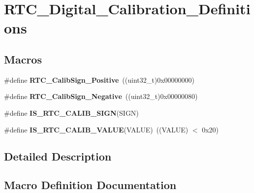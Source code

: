\hypertarget{group___r_t_c___digital___calibration___definitions}{}\section{R\+T\+C\+\_\+\+Digital\+\_\+\+Calibration\+\_\+\+Definitions}
\label{group___r_t_c___digital___calibration___definitions}
\subsection*{Macros}
\begin{DoxyCompactItemize}
\item 
\hypertarget{group___r_t_c___digital___calibration___definitions_gaf3e952081f1b3e73b9abc9a53ce465bb}{}\#define {\bfseries R\+T\+C\+\_\+\+Calib\+Sign\+\_\+\+Positive}~((uint32\+\_\+t)0x00000000)\label{group___r_t_c___digital___calibration___definitions_gaf3e952081f1b3e73b9abc9a53ce465bb}

\item 
\hypertarget{group___r_t_c___digital___calibration___definitions_ga362c7fef775bee9999bc19a9b47175f7}{}\#define {\bfseries R\+T\+C\+\_\+\+Calib\+Sign\+\_\+\+Negative}~((uint32\+\_\+t)0x00000080)\label{group___r_t_c___digital___calibration___definitions_ga362c7fef775bee9999bc19a9b47175f7}

\item 
\#define {\bfseries I\+S\+\_\+\+R\+T\+C\+\_\+\+C\+A\+L\+I\+B\+\_\+\+S\+I\+G\+N}(S\+I\+G\+N)
\item 
\hypertarget{group___r_t_c___digital___calibration___definitions_gafa25555b5daedee7b1fcba41afa6ed8b}{}\#define {\bfseries I\+S\+\_\+\+R\+T\+C\+\_\+\+C\+A\+L\+I\+B\+\_\+\+V\+A\+L\+U\+E}(V\+A\+L\+U\+E)~((V\+A\+L\+U\+E) $<$ 0x20)\label{group___r_t_c___digital___calibration___definitions_gafa25555b5daedee7b1fcba41afa6ed8b}

\end{DoxyCompactItemize}


\subsection{Detailed Description}


\subsection{Macro Definition Documentation}
\hypertarget{group___r_t_c___digital___calibration___definitions_ga8e9688a85c6708500b5f56ddc056beb1}{}
